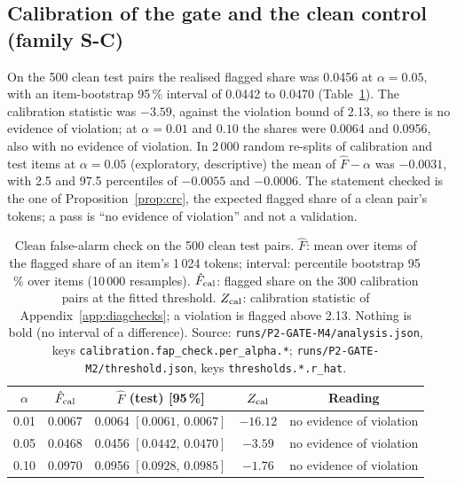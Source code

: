 \subsection{Calibration of the gate and the clean control (family S-C)}\label{ssec:res_cal}
On the 500 clean test pairs the realised flagged share was 0.0456 at $\alpha=0.05$, with an item-bootstrap 95\,\% interval of 0.0442 to
0.0470 (Table~\ref{tab:res_cal}).
The calibration statistic was $-3.59$, against the violation bound of 2.13, so there is no evidence of violation; at $\alpha=0.01$ and
$0.10$ the shares were 0.0064 and 0.0956, also with no evidence of violation.
In 2\,000 random re-splits of calibration and test items at $\alpha=0.05$ (exploratory, descriptive) the mean of $\hat F-\alpha$ was
$-0.0031$, with 2.5 and 97.5 percentiles of $-0.0055$ and $-0.0006$.
The statement checked is the one of Proposition~\ref{prop:crc}, the expected flagged share of a clean pair's tokens; a pass is ``no
evidence of violation'' and not a validation.

\begin{table}[!tbp]
\centering
\caption{Clean false-alarm check on the 500 clean test pairs. $\hat F$: mean over items of the flagged share of an item's 1\,024
tokens; interval: percentile bootstrap 95\,\% over items (10\,000 resamples). $\hat F_{\rm cal}$: flagged share on the 300 calibration
pairs at the fitted threshold. $Z_{\rm cal}$: calibration statistic of Appendix~\ref{app:diagchecks}; a violation is flagged above 2.13. Nothing
is bold (no interval of a difference). Source: \nolinkurl{runs/P2-GATE-M4/analysis.json}, keys
\nolinkurl{calibration.fap_check.per_alpha.*}; \nolinkurl{runs/P2-GATE-M2/threshold.json}, keys \nolinkurl{thresholds.*.r_hat}.}
\label{tab:res_cal}
\footnotesize
\begin{tabular}{ccccc}
\toprule
$\alpha$ & $\hat F_{\rm cal}$ & $\hat F$ (test) [95\,\%] & $Z_{\rm cal}$ & Reading \\
\midrule
0.01 & 0.0067 & 0.0064 $[0.0061,\,0.0067]$ & $-16.12$ & no evidence of violation \\
0.05 & 0.0468 & 0.0456 $[0.0442,\,0.0470]$ & $-3.59$ & no evidence of violation \\
0.10 & 0.0970 & 0.0956 $[0.0928,\,0.0985]$ & $-1.76$ & no evidence of violation \\
\bottomrule
\end{tabular}
\end{table}

